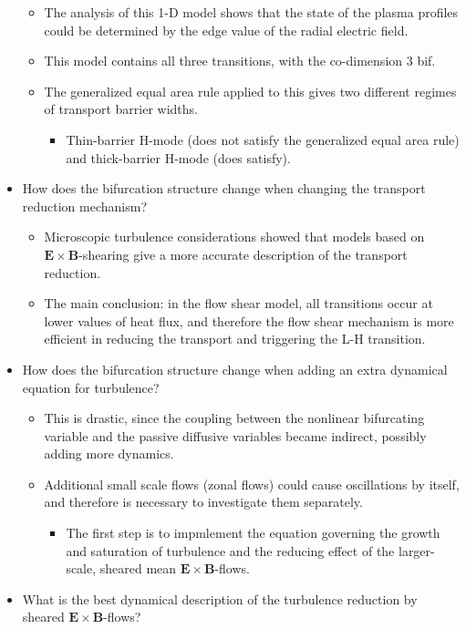 \documentclass[a4paper]{article}
\begin{document}
\begin{itemize}
  \begin{itemize}
  \item
    The analysis of this 1-D model shows that the state of the plasma
    profiles could be determined by the edge value of the radial
    electric field.
  \item
    This model contains all three transitions, with the co-dimension 3
    bif.
  \item
    The generalized equal area rule applied to this gives two different
    regimes of transport barrier widths.

    \begin{itemize}
    \itemsep1pt\parskip0pt
    \item
      Thin-barrier H-mode (does not satisfy the generalized equal area
      rule) and thick-barrier H-mode (does satisfy).
    \end{itemize}
  \end{itemize}
\item
  How does the bifurcation structure change when changing the transport
  reduction mechanism?

  \begin{itemize}
  \item
    Microscopic turbulence considerations showed that models based on
    $\mathbf{E}\times\mathbf{B}$-shearing give a more accurate
    description of the transport reduction.
  \item
    The main conclusion: in the flow shear model, all transitions occur
    at lower values of heat flux, and therefore the flow shear mechanism
    is more efficient in reducing the transport and triggering the L-H
    transition.
  \end{itemize}
\item
  How does the bifurcation structure change when adding an extra
  dynamical equation for turbulence?

  \begin{itemize}
  \item
    This is drastic, since the coupling between the nonlinear
    bifurcating variable and the passive diffusive variables became
    indirect, possibly adding more dynamics.
  \item
    Additional small scale flows (zonal flows) could cause oscillations
    by itself, and therefore is necessary to investigate them
    separately.

    \begin{itemize}
    \itemsep1pt\parskip0pt
    \item
      The first step is to impmlement the equation governing the growth
      and saturation of turbulence and the reducing effect of the
      larger-scale, sheared mean $\mathbf{E}\times\mathbf{B}$-flows.
    \end{itemize}
  \end{itemize}
\item
  What is the best dynamical description of the turbulence reduction by
  sheared $\mathbf{E}\times\mathbf{B}$-flows?


\end{itemize}
\end{document}

